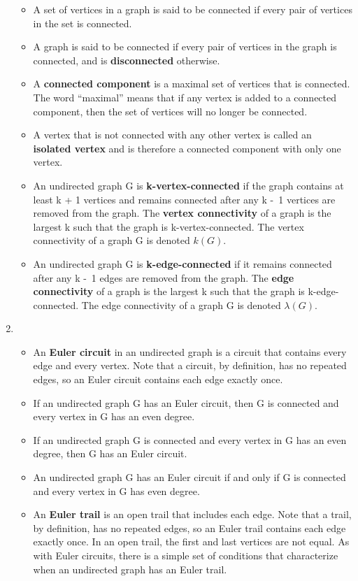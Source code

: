 \documentclass[12pt,a4paper]{article}
\begin{document}
\begin{enumerate}
  \begin{itemize}
    \item A set of vertices in a graph is said to be connected if every pair of vertices in the set is connected.
    \item A graph is said to be connected if every pair of vertices in the graph is connected, and is \textbf{disconnected} otherwise.
    \item A \textbf{connected component} is a maximal set of vertices that is connected. The word ``maximal'' means that if any vertex is added to a connected component, then the set of vertices will no longer be connected.
    \item A vertex that is not connected with any other vertex is called an \textbf{isolated vertex} and is therefore a connected component with only one vertex.
    \item An undirected graph G is \textbf{k-vertex-connected} if the graph contains at least k + 1 vertices and remains connected after any k -\ 1 vertices are removed from the graph. The \textbf{vertex connectivity} of a graph is the largest k such that the graph is k-vertex-connected. The vertex connectivity of a graph G is denoted \(k(G)\).
    \item An undirected graph G is \textbf{k-edge-connected} if it remains connected after any k -\ 1 edges are removed from the graph. The \textbf{edge connectivity} of a graph is the largest k such that the graph is k-edge-connected. The edge connectivity of a graph G is denoted \(\lambda (G)\).
  \end{itemize}
  \item {}
  \begin{itemize}
    \item An \textbf{Euler circuit} in an undirected graph is a circuit that contains every edge and every vertex. Note that a circuit, by definition, has no repeated edges, so an Euler circuit contains each edge exactly once.
    \item If an undirected graph G has an Euler circuit, then G is connected and every vertex in G has an even degree.
    \item If an undirected graph G is connected and every vertex in G has an even degree, then G has an Euler circuit.
    \item An undirected graph G has an Euler circuit if and only if G is connected and every vertex in G has even degree.
    \item An \textbf{Euler trail} is an open trail that includes each edge. Note that a trail, by definition, has no repeated edges, so an Euler trail contains each edge exactly once. In an open trail, the first and last vertices are not equal. As with Euler circuits, there is a simple set of conditions that characterize when an undirected graph has an Euler trail.

\end{itemize}
\end{enumerate}
\end{document}

